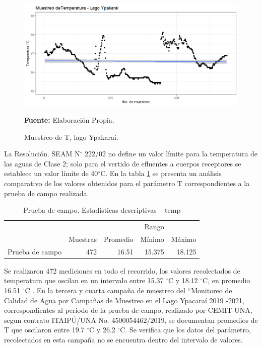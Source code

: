 \begin{figure}[H]
        \centering
        \includegraphics[width=0.75\linewidth]{Imagenes/cap4/Temp_lago.png}
        \caption {Muestreo de T, lago Ypakarai. }{\textbf{Fuente:}
        Elaboraci\'on Propia. }
        \label{fig:Lago_temp}
\end{figure}

La Resoluci\'on. SEAM N$ ^{\circ}$ 222/02 no define un valor límite para la temperatura de las aguas de Clase 2; solo para el vertido de efluentes a cuerpos receptores se establece un valor límite de 40$ ^{\circ}$C.
En la tabla \ref{table:Lago_temp} se presenta un an\'alisis comparativo de los valores obtenidos para el par\'ametro T correspondientes a la prueba de campo  realizada.

\begin{table}[H]
\centering
\caption{Prueba de campo. Estadísticas descriptivas – temp}
\label{table:Lago_temp}
\begin{tabular}{lrrrr}
\toprule
          & \multicolumn{3}{r}{Rango} \\ \cline{4-5}
          & Muestras & Promedio & Mínimo & Máximo \\
\midrule
Prueba de campo  &      472 &    16.51 & 15.375 & 18.125 \\
\bottomrule
\end{tabular}
\end{table}

Se realizaron 472 mediciones en todo el recorrido, los valores recolectados de temperatura que oscilan en  un intervalo entre 15.37 $ ^{\circ}$C y 18.12 $ ^{\circ}$C, en promedio 16.51 $^{\circ}$C .
En la tercera \cite{3er_Cemit} y cuarta \cite{4to_Cemit} campaña de muestreo del “Monitoreo de Calidad de Agua por Campañas de Muestreo en el Lago Ypacaraí 2019 -2021, correspondientes al periodo de la prueba de campo, realizado por CEMIT-UNA, segun contrato ITAIPÚ/UNA No. 4500054462/2019, se documentan promedios de T que oscilaron entre 19.7 $ ^{\circ}$C y 26.2 $ ^{\circ}$C. 
Se verifica que los datos del par\'ametro, recolectados en esta campa\~na no se encuentra dentro del intervalo de valores.

